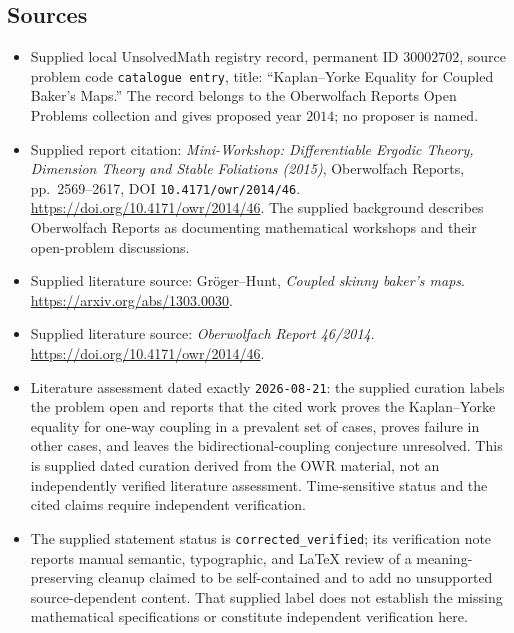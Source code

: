 \documentclass[11pt]{article}
\begin{document}
\subsection{Sources}
\begin{itemize}
\item Supplied local UnsolvedMath registry record, permanent ID \(30002702\), source problem code \texttt{catalogue entry}, title: ``Kaplan--Yorke Equality for Coupled Baker's Maps.'' The record belongs to the Oberwolfach Reports Open Problems collection and gives proposed year \(2014\); no proposer is named.
\item Supplied report citation: \emph{Mini-Workshop: Differentiable Ergodic Theory, Dimension Theory and Stable Foliations (2015)}, Oberwolfach Reports, pp.~2569--2617, DOI \texttt{10.4171/owr/2014/46}. \url{https://doi.org/10.4171/owr/2014/46}. The supplied background describes Oberwolfach Reports as documenting mathematical workshops and their open-problem discussions.
\item Supplied literature source: Gr\"oger--Hunt, \emph{Coupled skinny baker's maps}. \url{https://arxiv.org/abs/1303.0030}.
\item Supplied literature source: \emph{Oberwolfach Report 46/2014}. \url{https://doi.org/10.4171/owr/2014/46}.
\item Literature assessment dated exactly \texttt{2026-08-21}: the supplied curation labels the problem open and reports that the cited work proves the Kaplan--Yorke equality for one-way coupling in a prevalent set of cases, proves failure in other cases, and leaves the bidirectional-coupling conjecture unresolved. This is supplied dated curation derived from the OWR material, not an independently verified literature assessment. Time-sensitive status and the cited claims require independent verification.
\item The supplied statement status is \texttt{corrected\_verified}; its verification note reports manual semantic, typographic, and LaTeX review of a meaning-preserving cleanup claimed to be self-contained and to add no unsupported source-dependent content. That supplied label does not establish the missing mathematical specifications or constitute independent verification here.
\end{itemize}
\end{document}
